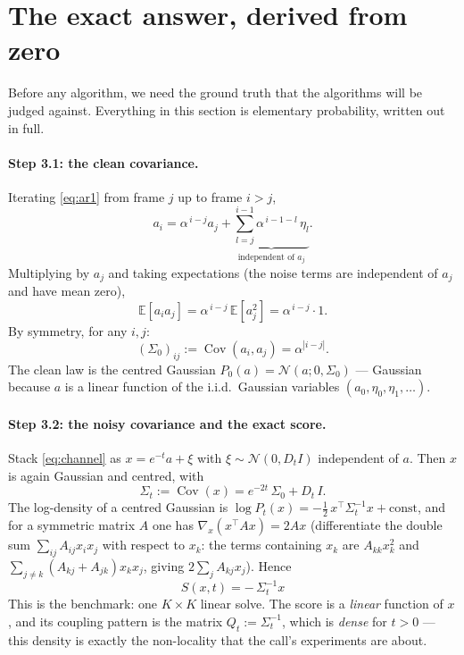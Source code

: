 \documentclass[11pt]{article}
\theoremstyle{definition}
\theoremstyle{remark}
\newcommand{\N}{\mathcal{N}}
\newcommand{\E}{\mathbb{E}}
\newcommand{\T}{^{\!\top}}
\DeclareMathOperator{\Cov}{Cov}
\begin{document}
\section{The exact answer, derived from zero}\label{sec:exact}

Before any algorithm, we need the ground truth that the algorithms will be
judged against. Everything in this section is elementary probability,
written out in full.

\paragraph{Step 3.1: the clean covariance.}\label{step:cov}
Iterating \eqref{eq:ar1} from frame $j$ up to frame $i>j$,
\[
  a_i=\alpha^{\,i-j}a_j+\underbrace{\textstyle\sum_{l=j}^{i-1}
  \alpha^{\,i-1-l}\,\eta_l}_{\text{independent of }a_j} .
\]
Multiplying by $a_j$ and taking expectations (the noise terms are
independent of $a_j$ and have mean zero),
\[
  \E[a_ia_j]=\alpha^{\,i-j}\,\E[a_j^2]=\alpha^{\,i-j}\cdot 1 .
\]
By symmetry, for any $i,j$:
\begin{equation}\label{eq:Sigma0}
  (\Sigma_0)_{ij}:=\Cov(a_i,a_j)=\alpha^{|i-j|} .
\end{equation}
The clean law is the centred Gaussian $P_0(a)=\N(a;0,\Sigma_0)$ --- Gaussian
because $a$ is a linear function of the i.i.d.\ Gaussian variables
$(a_0,\eta_0,\eta_1,\dots)$.

\paragraph{Step 3.2: the noisy covariance and the exact score.}
Stack \eqref{eq:channel} as $x=e^{-t}a+\xi$ with $\xi\sim\N(0,D_tI)$
independent of $a$. Then $x$ is again Gaussian and centred, with
\begin{equation}\label{eq:Sigmat}
  \Sigma_t:=\Cov(x)=e^{-2t}\,\Sigma_0+D_t\,I .
\end{equation}
The log-density of a centred Gaussian is
$\log P_t(x)=-\tfrac12\,x\T\Sigma_t^{-1}x+\text{const}$, and for a symmetric
matrix $A$ one has $\nabla_x(x\T A x)=2Ax$ (differentiate the double sum
$\sum_{ij}A_{ij}x_ix_j$ with respect to $x_k$: the terms containing $x_k$
are $A_{kk}x_k^2$ and $\sum_{j\ne k}(A_{kj}+A_{jk})x_kx_j$, giving
$2\sum_jA_{kj}x_j$). Hence
\begin{equation}\label{eq:score-exact}
  \boxed{\;S(x,t)=-\,\Sigma_t^{-1}x\;}
\end{equation}
This is the benchmark: one $K\times K$ linear solve. The score is a
\emph{linear} function of $x$, and its coupling pattern is the matrix
$Q_t:=\Sigma_t^{-1}$, which is \emph{dense} for $t>0$ --- this density is
exactly the non-locality that the call's experiments are about.
\end{document}
